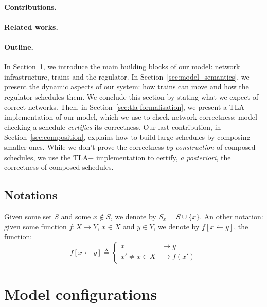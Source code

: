 \documentclass[runningheads]{llncs}
\begin{document}
\paragraph{Contributions.}


\paragraph{Related works.}


\paragraph{Outline.}
In Section~\ref{sec:model_configurations}, we introduce the main building blocks of our model: network infrastructure, trains and the regulator. In Section~\ref{sec:model_semantics}, we present the dynamic aspects of our system: how trains can move and how the regulator schedules them. We conclude this section by stating what we expect of correct networks. Then, in Section~\ref{sec:tla-formalisation}, we present a TLA+ implementation of our model, which we use to check network correctness: model checking a schedule \emph{certifies} its correctness. Our last contribution, in Section~\ref{sec:composition}, explains how to build large schedules by composing smaller ones. While we don't prove the correctness \emph{by construction} of composed schedules, we use the TLA+ implementation to certify, \emph{a posteriori}, the correctness of composed schedules.



\subsection{Notations}

Given some set $S$ and some $x \not\in S$, we denote by $S_x = S \cup \{ x\}$.  An other notation: given some function $f: X \to Y$, $x \in X$ and $y \in Y$, we denote by $f[x \leftarrow y]$, the function:
 $$f[x \leftarrow y] \triangleq \left\{  \begin{array}{ll} x &\mapsto y\\
x' \neq x \in X &\mapsto f(x')
\end{array}\right.$$


\section{Model configurations}
\label{sec:model_configurations}
\end{document}
